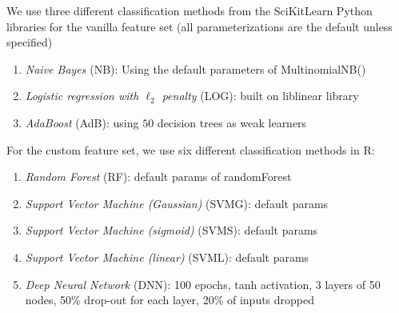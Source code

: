 \documentclass{article} %
\begin{document}
We use three different classification methods from the SciKitLearn Python libraries for the vanilla feature set (all parameterizations are the default unless specified)
\begin{enumerate}
\item \emph{Naive Bayes} (NB): Using the default parameters of MultinomialNB()
\item \emph{Logistic regression with $\ell_2$ penalty} (LOG): built on liblinear library
\item \emph{AdaBoost} (AdB): using $50$ decision trees as weak learners
\end{enumerate}

For the custom feature set, we use six different classification methods in R:
\begin{enumerate}
\item \emph{Random Forest} (RF): default params of randomForest
\item \emph{Support Vector Machine (Gaussian)} (SVMG): default params
\item \emph{Support Vector Machine (sigmoid)} (SVMS): default params
\item \emph{Support Vector Machine (linear)} (SVML): default params
\item \emph{Deep Neural Network} (DNN): 100 epochs, tanh activation, 3 layers of 50 nodes, 50\% drop-out for each layer, 20\% of inputs dropped
\end{enumerate}
\end{document}
